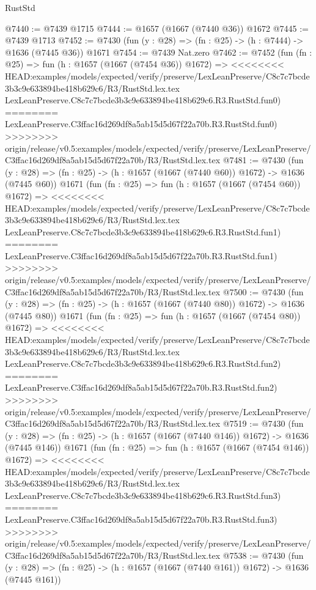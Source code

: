 \begin{lexlean}{RustStd}
\begin{coremodule}
{\begin{coremodule}
{{{{{{{{{{{{{{{{@7440 := @7439 @1715
@7444 := @1657 (@1667 (@7440 @36)) @1672
@7445 := @7439 @1713
@7452 := @7430 (fun (y : @28) => (fn : @25) -> (h : @7444) -> @1636 (@7445 @36)) @1671
@7454 := @7439 Nat.zero
@7462 := @7452
    (fun (fn : @25) =>
    fun (h : @1657 (@1667 (@7454 @36)) @1672) =>
<<<<<<<< HEAD:examples/models/expected/verify/preserve/LexLeanPreserve/C8c7c7bcde3b3c9e633894be418b629c6/R3/RustStd.lex.tex
    LexLeanPreserve.C8c7c7bcde3b3c9e633894be418b629c6.R3.RustStd.fun0)
========
    LexLeanPreserve.C3ffac16d269df8a5ab15d5d67f22a70b.R3.RustStd.fun0)
>>>>>>>> origin/release/v0.5:examples/models/expected/verify/preserve/LexLeanPreserve/C3ffac16d269df8a5ab15d5d67f22a70b/R3/RustStd.lex.tex
@7481 := @7430
    (fun (y : @28) => (fn : @25) -> (h : @1657 (@1667 (@7440 @60)) @1672) -> @1636 (@7445 @60))
    @1671
    (fun (fn : @25) =>
    fun (h : @1657 (@1667 (@7454 @60)) @1672) =>
<<<<<<<< HEAD:examples/models/expected/verify/preserve/LexLeanPreserve/C8c7c7bcde3b3c9e633894be418b629c6/R3/RustStd.lex.tex
    LexLeanPreserve.C8c7c7bcde3b3c9e633894be418b629c6.R3.RustStd.fun1)
========
    LexLeanPreserve.C3ffac16d269df8a5ab15d5d67f22a70b.R3.RustStd.fun1)
>>>>>>>> origin/release/v0.5:examples/models/expected/verify/preserve/LexLeanPreserve/C3ffac16d269df8a5ab15d5d67f22a70b/R3/RustStd.lex.tex
@7500 := @7430
    (fun (y : @28) => (fn : @25) -> (h : @1657 (@1667 (@7440 @80)) @1672) -> @1636 (@7445 @80))
    @1671
    (fun (fn : @25) =>
    fun (h : @1657 (@1667 (@7454 @80)) @1672) =>
<<<<<<<< HEAD:examples/models/expected/verify/preserve/LexLeanPreserve/C8c7c7bcde3b3c9e633894be418b629c6/R3/RustStd.lex.tex
    LexLeanPreserve.C8c7c7bcde3b3c9e633894be418b629c6.R3.RustStd.fun2)
========
    LexLeanPreserve.C3ffac16d269df8a5ab15d5d67f22a70b.R3.RustStd.fun2)
>>>>>>>> origin/release/v0.5:examples/models/expected/verify/preserve/LexLeanPreserve/C3ffac16d269df8a5ab15d5d67f22a70b/R3/RustStd.lex.tex
@7519 := @7430
    (fun (y : @28) => (fn : @25) -> (h : @1657 (@1667 (@7440 @146)) @1672) -> @1636 (@7445 @146))
    @1671
    (fun (fn : @25) =>
    fun (h : @1657 (@1667 (@7454 @146)) @1672) =>
<<<<<<<< HEAD:examples/models/expected/verify/preserve/LexLeanPreserve/C8c7c7bcde3b3c9e633894be418b629c6/R3/RustStd.lex.tex
    LexLeanPreserve.C8c7c7bcde3b3c9e633894be418b629c6.R3.RustStd.fun3)
========
    LexLeanPreserve.C3ffac16d269df8a5ab15d5d67f22a70b.R3.RustStd.fun3)
>>>>>>>> origin/release/v0.5:examples/models/expected/verify/preserve/LexLeanPreserve/C3ffac16d269df8a5ab15d5d67f22a70b/R3/RustStd.lex.tex
@7538 := @7430
    (fun (y : @28) => (fn : @25) -> (h : @1657 (@1667 (@7440 @161)) @1672) -> @1636 (@7445 @161))
}}}}}}}}}}}}}}}}
\end{coremodule}}
\end{coremodule}
\end{lexlean}
